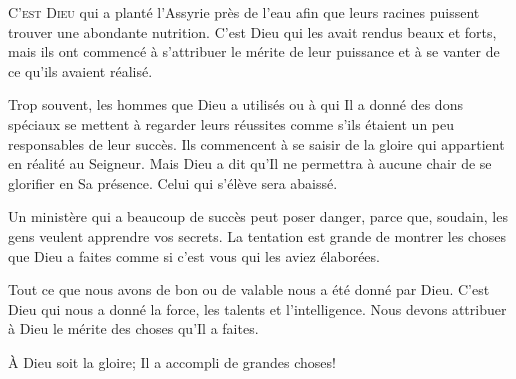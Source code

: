 


\lettrine{C}{'est Dieu} qui a \Og planté \Fg{} l'Assyrie
 près de l'eau afin que leurs racines puissent trouver une abondante nutrition.
 C'est Dieu qui les avait rendus beaux et forts,
 mais ils ont commencé à s'attribuer le mérite de leur puissance
 et à se vanter de ce qu'ils avaient réalisé.


Trop souvent, les hommes que Dieu a utilisés ou à qui Il a donné des dons
 spéciaux se mettent à regarder leurs réussites comme s'ils étaient
 un peu responsables de leur succès.
 Ils commencent à se saisir de la gloire qui appartient en réalité au Seigneur.
 Mais Dieu a dit qu'Il ne permettra à aucune chair de se glorifier
 en Sa présence. Celui qui s'élève sera abaissé.

Un ministère qui a beaucoup de succès peut poser danger, parce que,
 soudain, les gens veulent apprendre vos secrets.
 La tentation est grande de montrer les choses que Dieu a faites
 comme si c'est vous qui les aviez élaborées.

Tout ce que nous avons de bon ou de valable nous a été donné par Dieu.
 C'est Dieu qui nous a donné la force, les talents et l'intelligence.
 Nous devons attribuer à Dieu le mérite des choses qu'Il a faites.

À Dieu soit la gloire; Il a accompli de grandes choses!


\dvrule






